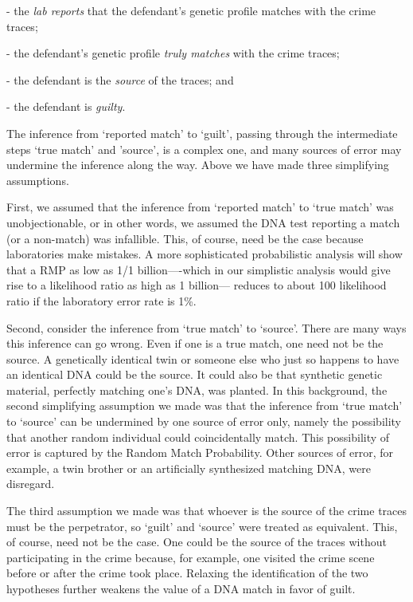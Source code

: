 \documentclass[10pt]{article}
\begin{document}
- the \textit{lab reports} that the defendant's 
genetic profile matches with the crime traces;

- the defendant's genetic profile \textit{truly matches} with the crime traces; 

- the defendant is the \textit{source} of the traces; and




- the defendant is \textit{guilty}.

\noindent
The inference from `reported match'  
to `guilt', passing through the intermediate steps `true match' and 'source', is a complex one, 
and many sources of error may undermine the inference along the way.  
Above we have made three simplifying 
assumptions. 

First, we assumed that the inference from `reported match' to `true match' was unobjectionable, or in other words, we assumed
the DNA test reporting a match (or a non-match) was infallible. This, of course, need be the case because laboratories make mistakes.
A more sophisticated probabilistic analysis will show that a RMP as low as 1/1 billion----which in our simplistic analysis would give rise to a likelihood ratio as high as 1 billion---  
reduces to about 100 likelihood ratio if the  laboratory error rate is 1\%.


Second, consider the inference from `true match' to `source'.
There are many ways this inference can go wrong. Even if one is a true match, one need not be the source. A genetically identical twin or someone else 
who just so happens to have an identical DNA could be the source. It could also be that synthetic genetic material, perfectly matching one's DNA, was planted. 
In this background, the second simplifying 
assumption we made was that the inference from `true match' to `source' can be undermined by 
one source of error only, namely the possibility that another random individual 
could coincidentally match. This possibility of error is captured by the 
Random Match Probability. 
Other sources of error, for example, a twin brother or an artificially synthesized matching DNA, were disregard. 

The third assumption we made was that whoever is the source of the crime traces must be the perpetrator, 
so `guilt' and `source' were treated as equivalent.  This, of course, need not be the case. One could be the source of the traces without participating in the crime because, for example, 
 one visited the crime scene before or after  the crime took place. Relaxing the identification of the two hypotheses 
further weakens the value of a DNA match in favor of guilt.
\end{document}
